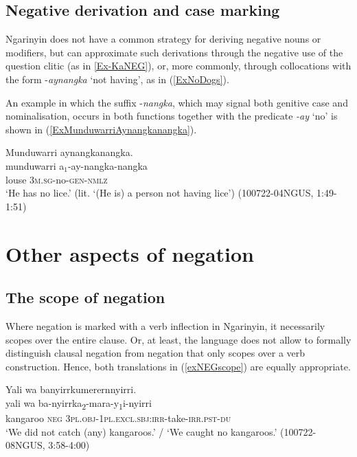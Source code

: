 \documentclass[output=paper,colorlinks,citecolor=brown]{langscibook}
\begin{document}
\subsection{Negative derivation and case marking}

Ngarinyin does not have a common strategy for deriving negative nouns or modifiers, but can approximate such derivations through the negative use of the question clitic (as in \ref{Ex-KaNEG}), or, more commonly, through collocations with the form {-\textit{aynangka}} `not having', as in (\ref{ExNoDogs}).

An example in which the suffix -\textit{nangka}, which may signal both genitive case and nominalisation, occurs in both functions together with the predicate \textit{-ay} `no' is shown in (\ref{ExMunduwarriAynangkanangka}).

\begin{exe}
\ex \label{ExMunduwarriAynangkanangka}
\glll Munduwarri aynangkanangka.\\
munduwarri a$_1$-ay-nangka-nangka\\
louse 3\textsc{m.sg}-no-\textsc{gen}-\textsc{nmlz}\\
\trans `He has no lice.' (lit. `(He is) a person not having lice') (100722-04NGUS, 1:49-1:51)
\end{exe}

\section{Other aspects of negation} \label{SecOtherAspects}

\subsection{The scope of negation}

Where negation is marked with a verb inflection in Ngarinyin, it necessarily scopes over the entire clause. Or, at least, the language does not allow to formally distinguish clausal negation from negation that only scopes over a verb construction. Hence, both translations in (\ref{exNEGscope}) are equally appropriate.

\begin{exe}
\ex \label{exNEGscope}
\glll Yali wa banyirrkumerernnyirri.\\
yali wa ba-nyirrka\textsubscript{2}-mara-y\textsubscript{1}i-nyirri\\
kangaroo \textsc{neg} \textsc{3pl.obj-1pl.excl.sbj:irr}-take-\textsc{irr.pst-du}\\
\trans `We did not catch (any) kangaroos.' / `We caught no kangaroos.' (100722-08NGUS, 3:58-4:00)
\end{exe}
\end{document}
